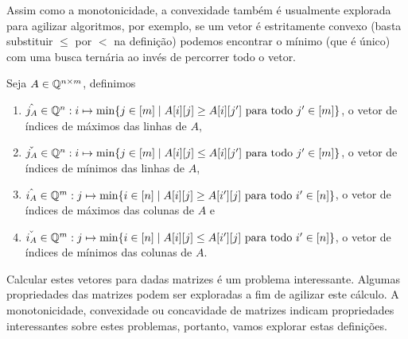 Assim como a monotonicidade, a convexidade também é usualmente explorada para agilizar algoritmos, por exemplo, se um vetor é estritamente convexo (basta substituir $\leq$ por $<$ na definição) podemos encontrar o mínimo (que é único) com uma busca ternária ao invés de percorrer todo o vetor.  

\begin{defi}
Seja $A \in \mathbb{Q}^{n \times m}$, definimos
    \begin{enumerate}
        \item $\hat{j_A} \in \mathbb{Q}^n : i \mapsto \min\{j \in [m] \mid A[i][j] \geq A[i][j'] \text{ para todo } j' \in [m]\}$, o vetor de índices de máximos das linhas de $A$,
        \item $\check{j_A} \in \mathbb{Q}^n : i \mapsto \min\{j \in [m] \mid A[i][j] \leq A[i][j'] \text{ para todo } j' \in [m]\}$, o vetor de índices de mínimos das linhas de $A$,
        \item $\hat{i_A} \in \mathbb{Q}^m : j \mapsto \min\{i \in [n] \mid A[i][j] \geq A[i'][j] \text{ para todo } i' \in [n]\}$, o vetor de índices de máximos das colunas de $A$ e 
        \item $\check{i_A} \in \mathbb{Q}^m : j \mapsto \min\{i \in [n] \mid A[i][j] \leq A[i'][j] \text{ para todo } i' \in [n]\}$, o vetor de índices de mínimos das colunas de $A$.
    \end{enumerate}
\end{defi}

Calcular estes vetores para dadas matrizes é um problema interessante. Algumas propriedades das matrizes podem ser exploradas a fim de agilizar este cálculo. A monotonicidade, convexidade ou concavidade de matrizes indicam propriedades interessantes sobre estes problemas, portanto, vamos explorar estas definições.

